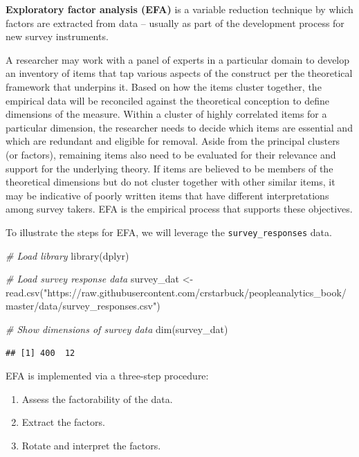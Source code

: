 \documentclass[
]{book}
\newenvironment{Shaded}{\begin{snugshade}}{\end{snugshade}}
\newcommand{\CommentTok}[1]{\textcolor[rgb]{0.56,0.35,0.01}{\textit{#1}}}
\newcommand{\FunctionTok}[1]{\textcolor[rgb]{0.00,0.00,0.00}{#1}}
\newcommand{\NormalTok}[1]{#1}
\newcommand{\OtherTok}[1]{\textcolor[rgb]{0.56,0.35,0.01}{#1}}
\newcommand{\StringTok}[1]{\textcolor[rgb]{0.31,0.60,0.02}{#1}}
\providecommand{\tightlist}{%
  \setlength{\itemsep}{0pt}\setlength{\parskip}{0pt}}
\begin{document}
\textbf{Exploratory factor analysis (EFA)} is a variable reduction technique by which factors are extracted from data -- usually as part of the development process for new survey instruments.

A researcher may work with a panel of experts in a particular domain to develop an inventory of items that tap various aspects of the construct per the theoretical framework that underpins it. Based on how the items cluster together, the empirical data will be reconciled against the theoretical conception to define dimensions of the measure. Within a cluster of highly correlated items for a particular dimension, the researcher needs to decide which items are essential and which are redundant and eligible for removal. Aside from the principal clusters (or factors), remaining items also need to be evaluated for their relevance and support for the underlying theory. If items are believed to be members of the theoretical dimensions but do not cluster together with other similar items, it may be indicative of poorly written items that have different interpretations among survey takers. EFA is the empirical process that supports these objectives.

To illustrate the steps for EFA, we will leverage the \texttt{survey\_responses} data.

\begin{Shaded}
\begin{Highlighting}[]
\CommentTok{\# Load library}
\FunctionTok{library}\NormalTok{(dplyr)}

\CommentTok{\# Load survey response data}
\NormalTok{survey\_dat }\OtherTok{\textless{}{-}} \FunctionTok{read.csv}\NormalTok{(}\StringTok{"https://raw.githubusercontent.com/crstarbuck/peopleanalytics\_book/master/data/survey\_responses.csv"}\NormalTok{)}

\CommentTok{\# Show dimensions of survey data}
\FunctionTok{dim}\NormalTok{(survey\_dat)}
\end{Highlighting}
\end{Shaded}

\begin{verbatim}
## [1] 400  12
\end{verbatim}

EFA is implemented via a three-step procedure:

\begin{enumerate}
\def\labelenumi{\arabic{enumi}.}
\tightlist
\item
  Assess the factorability of the data.
\item
  Extract the factors.
\item
  Rotate and interpret the factors.
\end{enumerate}
\end{document}
